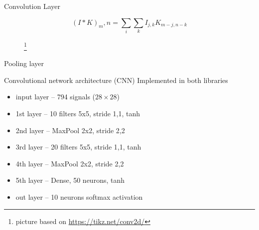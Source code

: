 \documentclass{beamer}%
\newcommand\blfootnote[1]{%
  \begingroup
  \renewcommand\thefootnote{}\footnote{#1}%
  \addtocounter{footnote}{-1}%
  \endgroup
}
\theoremstyle{definition}
\theoremstyle{definition}
\theoremstyle{example}
\theoremstyle{example}
\begin{document}
\begin{frame}[fragile]{Convolution Layer}

\begin{equation}
(I*K)_m,n = \sum_{i}\sum_{k}I_{j,k}K_{m-j, n-k}
\end{equation}

\begin{figure}
  \centering
  \blfootnote{\tiny picture based on \url{https://tikz.net/conv2d/}}

\end{figure}
\end{frame}

\begin{frame}[fragile]{Pooling layer}


\begin{figure}
  \centering
  

\end{figure}
\end{frame}

\begin{frame}{Convolutional network architecture (CNN)}
Implemented in both libraries
\begin{itemize}
  \item input layer -- 794 signals ($28\times28$)
  \item 1st layer -- 10 filters 5x5, stride 1,1, tanh
  \item 2nd layer -- MaxPool 2x2, stride 2,2
  \item 3rd layer -- 20 filters 5x5, stride 1,1, tanh
  \item 4th layer -- MaxPool 2x2, stride 2,2
  \item 5th layer -- Dense, 50 neurons, tanh
  \item out layer -- 10 neurons softmax activation
\end{itemize}
\end{frame}
\end{document}
